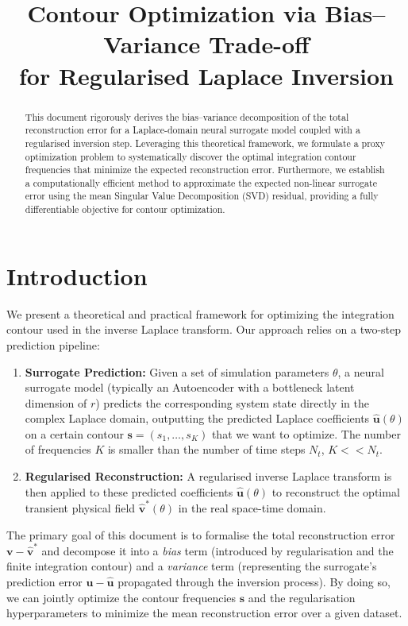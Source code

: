 \documentclass[11pt, a4paper]{article}
\title{%
  Contour Optimization via Bias--Variance Trade-off\\
  for Regularised Laplace Inversion
}
\author{}
\date{}
\begin{document}
\maketitle

\begin{abstract}
This document rigorously derives the bias--variance decomposition of the total reconstruction error for a Laplace-domain neural surrogate model coupled with a regularised inversion step. Leveraging this theoretical framework, we formulate a proxy optimization problem to systematically discover the optimal integration contour frequencies that minimize the expected reconstruction error. Furthermore, we establish a computationally efficient method to approximate the expected non-linear surrogate error using the mean Singular Value Decomposition (SVD) residual, providing a fully differentiable objective for contour optimization.
\end{abstract}

\tableofcontents
\newpage
\section{Introduction}

We present a theoretical and practical framework for optimizing the integration contour used in the inverse Laplace transform. Our approach relies on a two-step prediction pipeline:
\begin{enumerate}
    \item \textbf{Surrogate Prediction:} Given a set of simulation parameters $\theta$, a neural surrogate model (typically an Autoencoder with a bottleneck latent dimension of $r$) predicts the corresponding system state directly in the complex Laplace domain, outputting the predicted Laplace coefficients $\hat{\mathbf{u}}(\theta)$ on a certain contour $\mathbf{s} = (s_1, \dots, s_K)$ that we want to optimize. The number of frequencies $K$ is smaller than the number of time steps $N_t$, $K << N_t$.
    \item \textbf{Regularised Reconstruction:} A regularised inverse Laplace transform is then applied to these predicted coefficients $\hat{\mathbf{u}}(\theta)$ to reconstruct the optimal transient physical field $\hat{\mathbf{v}}^*(\theta)$ in the real space-time domain.
\end{enumerate}

The primary goal of this document is to formalise the total reconstruction error $\mathbf{v} - \hat{\mathbf{v}}^*$ and decompose it into a \emph{bias} term (introduced by regularisation and the finite integration contour) and a \emph{variance} term (representing the surrogate's prediction error $\mathbf{u} - \hat{\mathbf{u}}$ propagated through the inversion process). By doing so, we can jointly optimize the contour frequencies $\mathbf{s}$ and the regularisation hyperparameters to minimize the mean reconstruction error over a given dataset.
\end{document}
